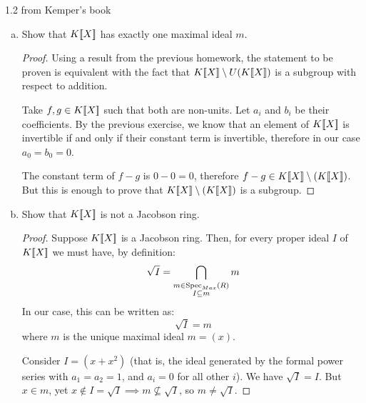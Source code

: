 \begin{problem*}{1.2 from Kemper's book}
\begin{enumerate}[(a)]
\begin{proof}
    For the second part of the problem: if \(a_0\) is invertible, then the inverse can be constructed as above. Otherwise, if such a \(g\) would exist, then \(a_0 b_0 = 1\), contradicting the assumption that \(a_0\) has no inverse in \(K\).
    \end{proof}
    
    \item Show that \(K [\![X]\!]\) has exactly one maximal ideal \(m\).
    \begin{proof}
    Using a result from the previous homework, the statement to be proven is equivalent with the fact that \(K [\![X]\!] \setminus U(K [\![X]\!])\) is a subgroup with respect to addition.
    
    Take \(f, g \in K [\![X]\!]\) such that both are non-units. Let \(a_i\) and \(b_i\) be their coefficients. By the previous exercise, we know that an element of \(K [\![X]\!]\) is invertible if and only if their constant term is invertible, therefore in our case \(a_0 = b_0 = 0\).
    
    The constant term of \(f - g\) is \(0 - 0 = 0\), therefore \(f - g \in K [\![X]\!]\setminus(K [\![X]\!])\). But this is enough to prove that \(K [\![X]\!]\setminus(K [\![X]\!])\) is a subgroup.
    \end{proof}
    
    \item Show that \(K [\![X]\!]\) is not a Jacobson ring.
    \begin{proof}
    Suppose \(K [\![X]\!]\) is a Jacobson ring. Then, for every proper ideal \(I\) of \(K [\![X]\!]\) we must have, by definition:
    \[
        \sqrt{I} = \bigcap_{\substack{m \in \operatorname{Spec}_{Max}(R) \\ I \subseteq m}} m
    \]
    In our case, this can be written as:
    \[
        \sqrt{I} = m
    \]
    where \(m\) is the unique maximal ideal \(m = (x)\).
    
    Consider \(I = (x + x^2)\) (that is, the ideal generated by the formal power series with \(a_1 = a_2 = 1\), and \(a_i = 0\) for all other \(i\)). We have \(\sqrt{I} = I\). But \(x \in m\), yet \(x \not\in I = \sqrt{I} \implies m \not\subseteq \sqrt{I}\), so \(m \neq \sqrt{I}\).
    \end{proof}
    

\end{enumerate}
\end{problem*}
